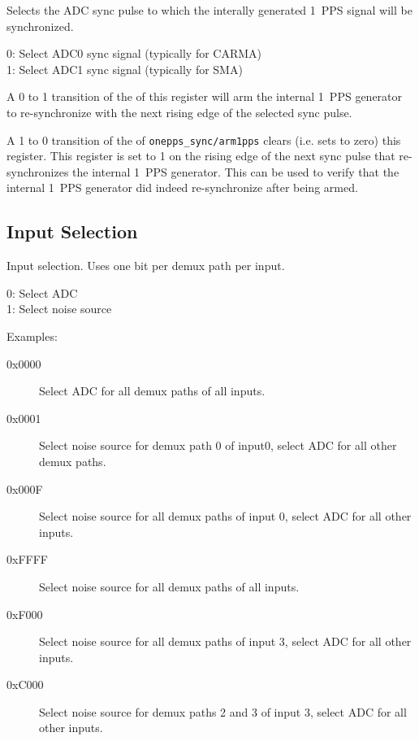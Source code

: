 \documentclass[12pt]{article}
\begin{document}
\begin{description}
 Selects the ADC sync pulse to which the interally generated
1~PPS signal will be synchronized.

0: Select ADC0 sync signal (typically for CARMA) \\
1: Select ADC1 sync signal (typically for SMA)

 A 0 to 1 transition of the \LSb of this register
will arm the internal 1~PPS generator to re-synchronize with the next rising
edge of the selected sync pulse.

 A 1 to 0 transition of the \LSb of
\verb|onepps_sync/arm1pps| clears (i.e. sets to zero) this register.  This
register is set to 1 on the rising edge of the next sync pulse that
re-synchronizes the internal 1~PPS generator.  This can be used to verify that
the internal 1~PPS generator did indeed re-synchronize after being armed.

\end{description}

  \subsection{Input Selection}

\begin{description}

  Input selection.  Uses one bit per demux path per input.

0: Select ADC \\
1: Select noise source

Examples:
\begin{description}

\item[0x0000] Select ADC for all demux paths of all inputs.
\item[0x0001] Select noise source for demux path 0 of input0, select ADC  for
               all other demux paths.
\item[0x000F] Select noise source for all demux paths of input 0, select ADC
               for all other inputs.
\item[0xFFFF] Select noise source for all demux paths of all inputs.
\item[0xF000] Select noise source for all demux paths of input 3, select ADC
               for all other inputs.
\item[0xC000] Select noise source for demux paths 2 and 3 of input 3, select
               ADC for all other inputs.
\end{description}
\end{description}
\end{document}
